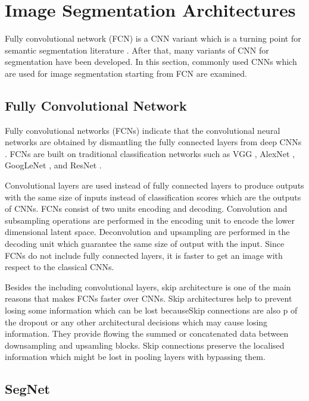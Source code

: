 \section{Image Segmentation Architectures}

    Fully convolutional network (FCN) is a CNN variant which is a turning point for semantic segmentation literature \cite{long2015fully}.
    After that, many variants of CNN for segmentation have been developed.
    In this section, commonly used CNNs which are used for image segmentation starting from FCN are examined.

    \subsection{Fully Convolutional Network}

        Fully convolutional networks (FCNs) indicate that the convolutional neural networks are obtained by dismantling the fully connected layers from deep CNNs \cite{ulku2019survey}.
        FCNs are built on traditional classification networks such as VGG \cite{simonyan2014very}, AlexNet \cite{krizhevsky2012imagenet}, GoogLeNet \cite{szegedy2014going}, and ResNet \cite{he2016deep}.

        Convolutional layers are used instead of fully connected layers to produce outputs with the same size of inputs  instead of classification scores which are the outputs of CNNs.
        FCNs consist of two units encoding and decoding. Convolution and subsampling operations are performed in the encoding unit to encode the lower dimensional latent space.
        Deconvolution and upsampling are performed in the decoding unit which guarantee the same size of output with the input.
        Since FCNs do not include fully connected layers, it is faster to get an image with respect to the classical CNNs.

        Besides the including convolutional layers, skip architecture is one of the main reasons that makes FCNs faster over CNNs.
        Skip architectures help to prevent losing some information which can be lost becauseSkip connections are also p of the dropout or any other architectural decisions which may cause losing information.
        They provide flowing the summed or concatenated data between downsampling and upsamling blocks.
        Skip connections preserve the localised information which might be lost in pooling layers with bypassing them.

    \subsection{SegNet}

